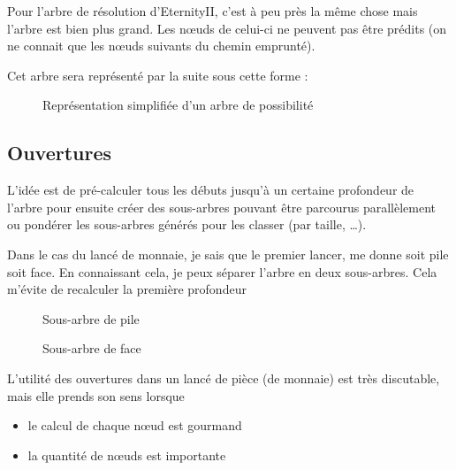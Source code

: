 	\begin{note}
		Pour l'arbre de résolution d'EternityII, c'est à peu près la même chose mais l'arbre est bien plus grand. Les n\oe uds de celui-ci ne peuvent pas être prédits (on ne connait que les n\oe uds suivants du chemin emprunté).
	\end{note}

	Cet arbre sera représenté par la suite sous cette forme :
	\begin{figure}[H]
	   	\begin{center}
	   			
	   	\end{center}
	   	
	   	\caption{Représentation simplifiée d'un arbre de possibilité}
	   	\label{fig:arbre}
	\end{figure}
	 \newpage

	\subsection{Ouvertures}
	
	L'idée est de pré-calculer tous les débuts jusqu'à un certaine profondeur de l'arbre pour ensuite créer des sous-arbres pouvant être parcourus parallèlement ou pondérer les sous-arbres générés pour les classer (par taille, \dots).
	
	\begin{exmp}
		Dans le cas du lancé de monnaie, je sais que le premier lancer, me donne soit pile soit face. En connaissant cela, je peux séparer l'arbre en deux sous-arbres. Cela m'évite de recalculer la première profondeur
		

		
		\begin{figure}[H]
			\begin{center}
				
			\end{center}
			\caption{Sous-arbre de pile}\label{fig:sous-arbre-pile}
			\endminipage\hfill
			\begin{center}
				
			\end{center}
			\caption{Sous-arbre de face}\label{fig:sous-arbre-face}
			\endminipage\hfill
		\end{figure}
	\end{exmp}
	
	\begin{rem}
		L'utilité des ouvertures dans un lancé de pièce (de monnaie) est très discutable, mais elle prends son sens lorsque
		
		\begin{itemize}
			\item le calcul de chaque n\oe ud est gourmand
			\item la quantité de n\oe uds est importante
		\end{itemize}  
	\end{rem}
	
